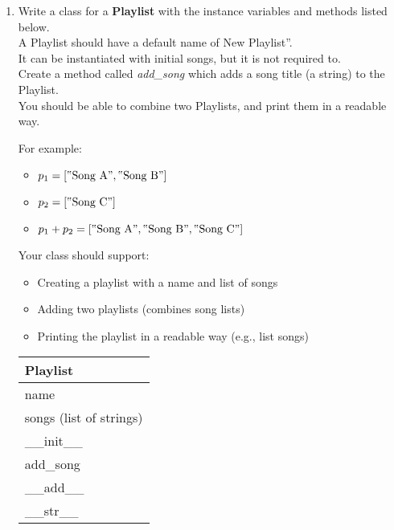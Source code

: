 \documentclass{article}
\newcommand{\csq}[1]{\reflectbox{''}#1''}  %
\newcommand{\csqt}[1]{\text{\reflectbox{''}#1''}}  %
\begin{document}
\begin{enumerate}
	\item %
		Write a class for a \textbf{Playlist} with the instance variables and methods listed 
		below.\\
		A Playlist should have a default name of \csq{New Playlist}.\\
		It can be instantiated with initial songs, but it is not required to.\\
		Create a method called \textit{add\_song} which adds a song title (a string) to the 
		Playlist.\\
		You should be able to combine two Playlists, and print them in a readable way.
			
		\begin{minipage}[t]{0.65\textwidth}
			For example:
			\begin{itemize}
				\item $p_1 = [\csqt{Song A}, \csqt{Song B}]$
				\item $p_2 = [\csqt{Song C}]$
				\item $p_1 + p_2 = [\csqt{Song A}, \csqt{Song B}, \csqt{Song C}]$
			\end{itemize}

			Your class should support:
			\begin{itemize}
				\item Creating a playlist with a name and list of songs
				\item Adding two playlists (combines song lists)
				\item Printing the playlist in a readable way (e.g., list songs)
			\end{itemize}	
		\end{minipage}
		\hfill
		\begin{minipage}[t]{0.32\textwidth}
			\vspace{.2em}
			\begin{flushright}
				\begin{tabular}{|l|}
					\hline
					Playlist \\ \hline
					name \\
					songs (list of strings) \\ \hline
					\_\_init\_\_ \\
					add\_song \\
					\_\_add\_\_ \\
					\_\_str\_\_ \\ \hline
				\end{tabular}
			\end{flushright}
		\end{minipage}
		

\end{enumerate}
\end{document}
